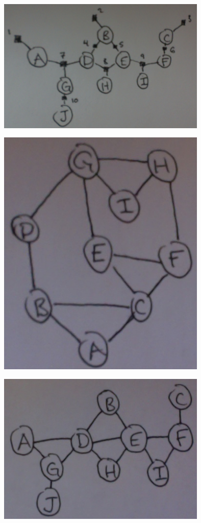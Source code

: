 \documentclass[solution, letterpaper]{cs121}
\begin{document}
\begin{empfile}
\begin{center}
\includegraphics[width=100mm]{factor_graph_b.png}
\end{center}

\subproblem %

\begin{center}
\includegraphics[width=100mm]{undirected_graph_a.png}
\end{center}

\begin{center}
\includegraphics[width=100mm]{undirected_graph_b.png}
\end{center}





\end{empfile}
\end{document}
